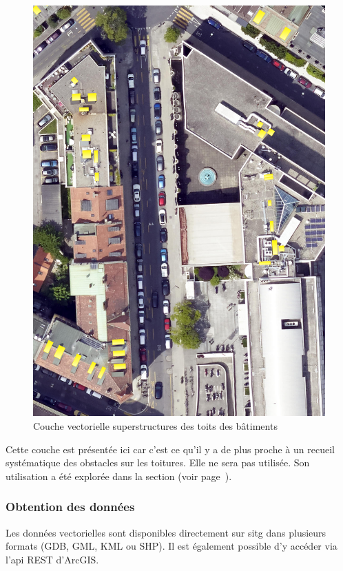 \begin{figure}[H]
    \centering
    \includegraphics[width=1\linewidth]{02-main//figures/ch3/ch3_dataset_methodo_04_batiment_horsol_toiture_sp.png}
    \caption{Couche vectorielle superstructures des toits des bâtiments}
    \label{fig:ch3_dataset_methodo_04_batiment_horsol_toiture_sp}
\end{figure}

Cette couche est présentée ici car c'est ce qu'il y a de plus proche à un recueil systématique des obstacles sur les toitures. Elle ne sera pas utilisée. Son utilisation a été explorée dans la section \textit{} (voir page~\pageref{sec:pistes_explorees}).

\subsubsection{Obtention des données}
Les données vectorielles sont disponibles directement sur \acrshort{sitg} dans plusieurs formats (GDB, GML, KML ou SHP). Il est également possible d'y accéder via l'\acrshort{api} REST d'ArcGIS.

